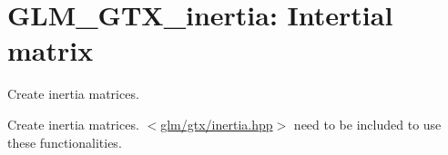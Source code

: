 \hypertarget{group__gtx__inertia}{\section{\-G\-L\-M\-\_\-\-G\-T\-X\-\_\-inertia\-: \-Intertial matrix}
\label{group__gtx__inertia}
}


\-Create inertia matrices.  


\-Create inertia matrices. $<$\hyperlink{inertia_8hpp}{glm/gtx/inertia.\-hpp}$>$ need to be included to use these functionalities. 